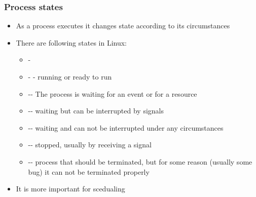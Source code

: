 \documentclass[usenames,dvipsnames,10pt,aspectratio=169]{beamer}
\begin{document}
\begin{frame}
    \frametitle{Process states}
    \begin{itemize}
        \item As a process executes it changes state according to its circumstances
        \item There are following states in Linux:
        \begin{itemize}
            \item -
            \item - - running or ready to run
            \item -- The process is waiting for an event or for a resource
            \item -- waiting but can be interrupted by signals
            \item -- waiting and can not be interrupted under any circumstances
            \item -- stopped, usually by receiving a signal
            \item -- process that should be terminated, but for some reason (usually some bug) it can not be terminated properly
        \end{itemize}
        \item It is more important for scedualing
    \end{itemize}
\end{frame}
\end{document}
